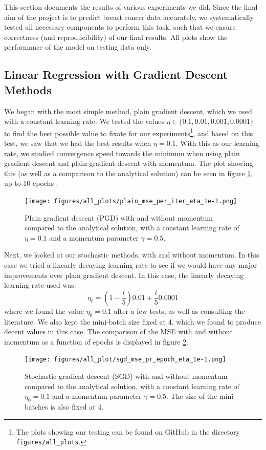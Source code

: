 This section documents the results of various experiments we did. Since the final aim of the
project is to predict breast cancer data accurately, we systematically tested all necessary components to perform this task, such that we ensure correctness (and reproducibility) of our final results. All plots show the performance of the model on testing data only.

\subsection{Linear Regression with Gradient Descent Methods}
We began with the most simple method, plain gradient descent, which we used with a constant learning rate. We tested the values $\eta \in \{ 0.1, 0.01, 0.001, 0.0001\}$ to find the best possible value to fixate for our experiments\footnote{The plots showing our testing can be found on GitHub in the directory \texttt{figures/all\_plots}.}, and based on this test, we saw that we had the best results when $\eta = 0.1$. With this as our learning rate, we studied convergence speed towards the minimum when using plain gradient descent and plain gradient descent with momentum. The plot showing this (as well as a comparison to the analytical solution) can be seen in figure \ref{fig:plainVSanalytical}, up to 10 epochs \cite{mediumEpochNumber}\cite{epochsBreastCancerArticle}.
\begin{figure}
    \centering
    \texttt{[image: figures/all\_plots/plain\_mse\_per\_iter\_eta\_1e-1.png]}
    \caption{Plain gradient descent (PGD) with and without momentum compared to the analytical solution, with a constant learning rate of $\eta = 0.1$ and a momentum parameter $\gamma = 0.5$.}
    \label{fig:plainVSanalytical}
\end{figure}

Next, we looked at our stochastic methods, with and without momentum. In this case we tried a linearly decaying learning rate to see if we would have any major improvements over plain gradient descent. In this case, the linearly decaying learning rate used was:
\[
\eta_t = (1- \frac{t}{5})0.01 + \frac{t}{5} 0.0001
\]
where we found the value $\eta_0 = 0.1$ after a few tests, as well as consulting the literature. We also kept the mini-batch size fixed at 4, which we found to produce decent values in this case. The comparison of the MSE with and without momentum as a function of epochs is displayed in figure \ref{fig:sgdVSanalytical}. 
\begin{figure}
    \centering
    \texttt{[image: figures/all\_plot/sgd\_mse\_pr\_epoch\_eta\_1e-1.png]}
    \caption{Stochastic gradient descent (SGD) with and without momentum compared to the analytical solution, with a constant learning rate of $\eta_0 = 0.1$ and a momentum parameter $\gamma = 0.5$. The size of the mini-batches is also fixed at 4.}
    \label{fig:sgdVSanalytical}
\end{figure}

